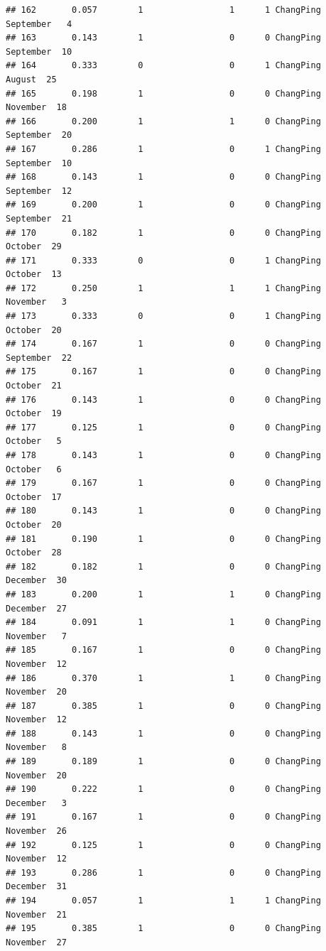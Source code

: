 \documentclass[
]{article}
\begin{document}
\begin{verbatim}
## 162       0.057        1                 1      1 ChangPing September   4
## 163       0.143        1                 0      0 ChangPing September  10
## 164       0.333        0                 0      1 ChangPing    August  25
## 165       0.198        1                 0      0 ChangPing  November  18
## 166       0.200        1                 1      0 ChangPing September  20
## 167       0.286        1                 0      1 ChangPing September  10
## 168       0.143        1                 0      0 ChangPing September  12
## 169       0.200        1                 0      0 ChangPing September  21
## 170       0.182        1                 0      0 ChangPing   October  29
## 171       0.333        0                 0      1 ChangPing   October  13
## 172       0.250        1                 1      1 ChangPing  November   3
## 173       0.333        0                 0      1 ChangPing   October  20
## 174       0.167        1                 0      0 ChangPing September  22
## 175       0.167        1                 0      0 ChangPing   October  21
## 176       0.143        1                 0      0 ChangPing   October  19
## 177       0.125        1                 0      0 ChangPing   October   5
## 178       0.143        1                 0      0 ChangPing   October   6
## 179       0.167        1                 0      0 ChangPing   October  17
## 180       0.143        1                 0      0 ChangPing   October  20
## 181       0.190        1                 0      0 ChangPing   October  28
## 182       0.182        1                 0      0 ChangPing  December  30
## 183       0.200        1                 1      0 ChangPing  December  27
## 184       0.091        1                 1      0 ChangPing  November   7
## 185       0.167        1                 0      0 ChangPing  November  12
## 186       0.370        1                 1      0 ChangPing  November  20
## 187       0.385        1                 0      0 ChangPing  November  12
## 188       0.143        1                 0      0 ChangPing  November   8
## 189       0.189        1                 0      0 ChangPing  November  20
## 190       0.222        1                 0      0 ChangPing  December   3
## 191       0.167        1                 0      0 ChangPing  November  26
## 192       0.125        1                 0      0 ChangPing  November  12
## 193       0.286        1                 0      0 ChangPing  December  31
## 194       0.057        1                 1      1 ChangPing  November  21
## 195       0.385        1                 0      0 ChangPing  November  27

\end{verbatim}
\end{document}
